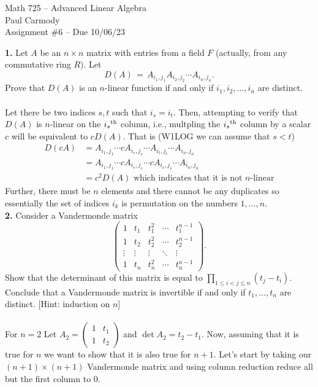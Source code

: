 \documentclass[11pt]{amsart}
\theoremstyle{definition}  %
\begin{document}
\newcommand{\ts}{\textsuperscript}

\begin{center}
\Large{Math 725 -- Advanced Linear Algebra}\\
\large{Paul Carmody}\\
Assignment \#6 -- Due 10/06/23
\end{center}

\vskip 1.0cm

\noindent
{\bf 1.} Let $A$ be an $n \times n$ matrix with entries from a field $F$ (actually, from any commutative ring $R$). Let 
$$ D(A)  \, = \, A_{i_1, j_1} A_{i_2, j_2} \cdots A_{i_n, j_n}.$$
Prove that $D(A)$ is an $n$-linear function if and only if $i_1, i_2, \ldots, i_n$ are distinct. \\
\\
Let there be two indices $s, t$ such that $i_s=i_t$.  Then, attempting to verify that $D(A)$ is $n$-linear on the $i_s\ts{th}$ column, i.e., multpling the $i_s\ts{th}$ column by a scalar $c$ will be equivalent to $cD(A)$.  That is (W1LOG we can assume that $s<t$)
\begin{align*}
	D(cA) &= A_{i_1, j_1} \cdots cA_{i_s,j_s}\cdots A_{i_t,j_t} \cdots A_{i_n, j_n} \\
	&= A_{i_1, j_1} \cdots cA_{i_s,j_s}\cdots cA_{i_s,j_s} \cdots A_{i_n, j_n}\\
	&= c^2D(A) \text{ which indicates that it is not $n$-linear}
\end{align*}Further, there must be $n$ elements and there cannot be any duplicates so essentially the set of indices $i_k$ is permutation on the numbers $1,\dots,n$.
\\
\newpage
\vskip 0.1cm
\noindent
{\bf 2.}  Consider a Vandermonde matrix
$$\left( \begin{array}{ccccc} 1 & t_1 & t_1^2 & \cdots & t_1^{n-1} \\
1 & t_2 & t_2^2 & \cdots & t_2^{n-1} \\
\vdots & \vdots & \vdots & \ddots & \vdots \\
1 & t_n & t_n^2 & \cdots & t_n^{n-1} 
\end{array} \right).$$
Show that the determinant of this matrix is equal to $\prod_{1 \leq i < j \leq n} (t_j - t_i)$. Conclude that a Vandermonde matrix is invertible if and only if $t_1, \ldots, t_n$ are
distinct. [Hint: induction on $n$]\\
\\
For $n=2$  Let $A_2=\begin{pmatrix}
 1 & t_1 \\
 1 & t_2
\end{pmatrix}$ and $\det A_2 = t_2-t_1$.  Now, assuming that it is true for $n$ we want to show that it is also true for $n+1$.  Let's start by taking our $(n+1)\times (n+1)$ Vandermonde matrix and using column reduction reduce all but the first column to 0.
\end{document}
